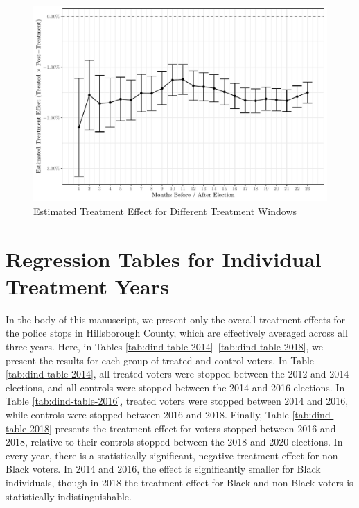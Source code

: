 \documentclass[
  12pt,
]{article}
\begin{document}
\begin{figure}[H]

{\centering \includegraphics{si_files/figure-latex/windows-1} 

}

\caption{\label{fig:rob-window}Estimated Treatment Effect for Different Treatment Windows}\label{fig:windows}
\end{figure}

\hypertarget{regression-tables-for-individual-treatment-years}{%
\section*{Regression Tables for Individual Treatment Years}\label{regression-tables-for-individual-treatment-years}}

In the body of this manuscript, we present only the overall treatment effects for the police stops in Hillsborough County, which are effectively averaged across all three years. Here, in Tables \ref{tab:dind-table-2014}--\ref{tab:dind-table-2018}, we present the results for each group of treated and control voters. In Table \ref{tab:dind-table-2014}, all treated voters were stopped between the 2012 and 2014 elections, and all controls were stopped between the 2014 and 2016 elections. In Table \ref{tab:dind-table-2016}, treated voters were stopped between 2014 and 2016, while controls were stopped between 2016 and 2018. Finally, Table \ref{tab:dind-table-2018} presents the treatment effect for voters stopped between 2016 and 2018, relative to their controls stopped between the 2018 and 2020 elections. In every year, there is a statistically significant, negative treatment effect for non-Black voters. In 2014 and 2016, the effect is significantly smaller for Black individuals, though in 2018 the treatment effect for Black and non-Black voters is statistically indistinguishable.
\end{document}
